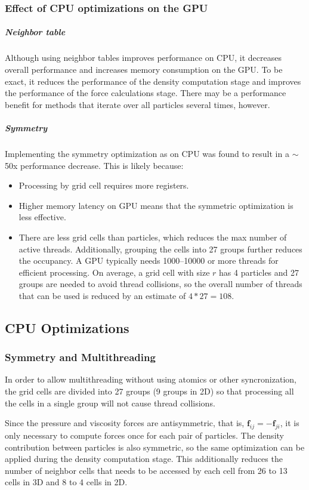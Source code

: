 \documentclass[]{article}
\begin{document}
		\subsubsection{Effect of CPU optimizations on the GPU}
			\subparagraph{Neighbor table}
				Although using neighbor tables improves performance on CPU, it decreases overall performance and 
				increases memory consumption on the GPU. To be exact, it reduces the performance of the density
				computation stage and improves the performance of the force calculations stage. There may be a 
				performance benefit for methods that iterate over all particles several times, however.
			\subparagraph{Symmetry}
				Implementing the symmetry optimization as on CPU was found to result in a \(\sim\)50x performance decrease.
				This is likely because:
				\begin{itemize}
					\item Processing by grid cell requires more registers.
					\item Higher memory latency on GPU means that the symmetric optimization is less effective.
					\item There are less grid cells than particles, which reduces the max number of active threads.
					Additionally, grouping the cells into 27 groups further reduces the occupancy. A GPU typically needs
					1000--10000 or more threads for efficient processing. On average, a grid cell with size \(r\) has 4
					particles and 27 groups are needed to avoid thread collisions, so the overall number of threads that
					can be used is reduced by an estimate of \(4 * 27 = 108\).
				\end{itemize}
			
	\subsection{CPU Optimizations}
		\subsubsection{Symmetry and Multithreading}
			In order to allow multithreading without using atomics or other syncronization, the grid cells are divided 
			into 27 groups (9 groups in 2D) so that processing all the cells in a single group will not cause thread 
			collisions.
			
			Since the pressure and viscosity forces are antisymmetric, that is, \(\mathbf{f}_{ij} = - \mathbf{f}_{ji}\),
			it is only necessary to compute forces once for each pair of particles. The density contribution between 
			particles is also symmetric, so the same optimization can be applied during the density computation stage. 
			This additionally reduces the number of neighbor cells that needs to be accessed by each cell from 26 to 
			13 cells in 3D and 8 to 4 cells in 2D.
			
\end{document}
